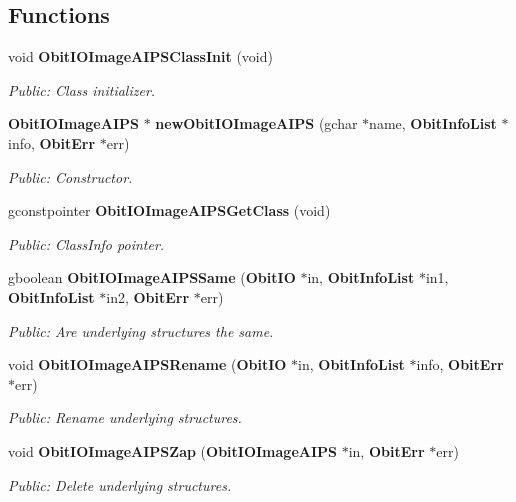\subsection*{Functions}
\begin{CompactItemize}
\item 
void {\bf Obit\-IOImage\-AIPSClass\-Init} (void)
\begin{CompactList}\small\item\em Public: Class initializer. \item\end{CompactList}\item 
{\bf Obit\-IOImage\-AIPS} $\ast$ {\bf new\-Obit\-IOImage\-AIPS} (gchar $\ast$name, {\bf Obit\-Info\-List} $\ast$info, {\bf Obit\-Err} $\ast$err)
\begin{CompactList}\small\item\em Public: Constructor. \item\end{CompactList}\item 
gconstpointer {\bf Obit\-IOImage\-AIPSGet\-Class} (void)
\begin{CompactList}\small\item\em Public: Class\-Info pointer. \item\end{CompactList}\item 
gboolean {\bf Obit\-IOImage\-AIPSSame} ({\bf Obit\-IO} $\ast$in, {\bf Obit\-Info\-List} $\ast$in1, {\bf Obit\-Info\-List} $\ast$in2, {\bf Obit\-Err} $\ast$err)
\begin{CompactList}\small\item\em Public: Are underlying structures the same. \item\end{CompactList}\item 
void {\bf Obit\-IOImage\-AIPSRename} ({\bf Obit\-IO} $\ast$in, {\bf Obit\-Info\-List} $\ast$info, {\bf Obit\-Err} $\ast$err)
\begin{CompactList}\small\item\em Public: Rename underlying structures. \item\end{CompactList}\item 
void {\bf Obit\-IOImage\-AIPSZap} ({\bf Obit\-IOImage\-AIPS} $\ast$in, {\bf Obit\-Err} $\ast$err)
\begin{CompactList}\small\item\em Public: Delete underlying structures. \item\end{CompactList}\item 

\end{CompactItemize}

